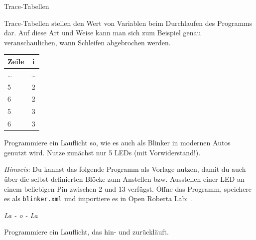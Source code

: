 \begin{zsfg}{Trace-Tabellen}
	\begin{minipage}{0.78\textwidth}
		Trace-Tabellen stellen den Wert von Variablen beim Durchlaufen des Programms dar. Auf diese Art und Weise kann man sich zum Beispiel genau veranschaulichen, wann Schleifen abgebrochen werden.
	\end{minipage}
	\hfill
	\begin{minipage}{0.2\textwidth}
		\centering
		\scriptsize
		\begin{tabular}{l | c}
			\textbf{Zeile} & \textbf{i} \\ \hline
			\dots & \dots \\ \hline
			5 & 2 \\ \hline
			6 & 2 \\ \hline
			5 & 3 \\ \hline
			6 & 3 \\ \hline
		\end{tabular}
	\end{minipage}	
\end{zsfg}

\bigskip
{}
\begin{projekt}\label{proj:blinker}
	Programmiere ein Lauflicht so, wie es auch als Blinker in modernen Autos genutzt wird. Nutze zunächst nur 5 LEDs (mit Vorwiderstand!).
	
	\medskip
	\emph{Hinweis:} Du kannst das folgende Programm als Vorlage nutzen, damit du auch über die selbst definierten Blöcke zum Anstellen bzw. Ausstellen einer LED an einem beliebigen Pin zwischen 2 und 13 verfügst. Öffne das Programm, speichere es als \texttt{blinker.xml} und importiere es in Open Roberta Lab:
	.
\end{projekt}

\begin{aufgabe} \emph{La - o - La}
	
	Programmiere ein Lauflicht, das hin- und zurückläuft.
\end{aufgabe}

\vfill

